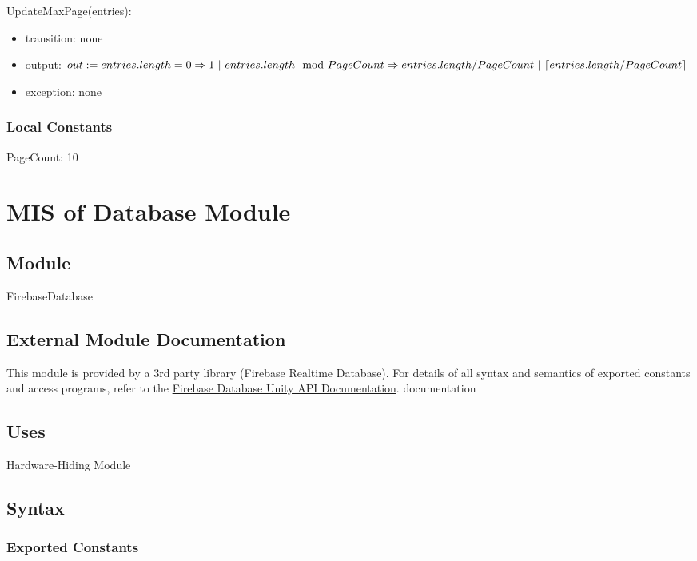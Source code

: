 \documentclass[12pt, titlepage]{article}
\begin{document}
\noindent UpdateMaxPage(entries):
\begin{itemize}
\item transition: none
\item output: $out := entries.length = 0 \Rightarrow 1\ |\ entries.length \mod PageCount\\ \Rightarrow entries.length/PageCount\ |\ \lceil entries.length/PageCount \rceil$
\item exception: none
\end{itemize}

\subsubsection{Local Constants}

PageCount: 10

\newpage

\section{MIS of Database Module} \label{mDB}

\subsection{Module}

FirebaseDatabase

\subsection{External Module Documentation}

This module is provided by a 3rd party library (Firebase Realtime Database). For details of all syntax and semantics of exported constants and access programs, refer to the \href{https://firebase.google.com/docs/reference/unity/namespace/firebase/database}{Firebase Database Unity API Documentation}.
documentation

\subsection{Uses}

Hardware-Hiding Module

\subsection{Syntax}

\subsubsection{Exported Constants}
\end{document}
